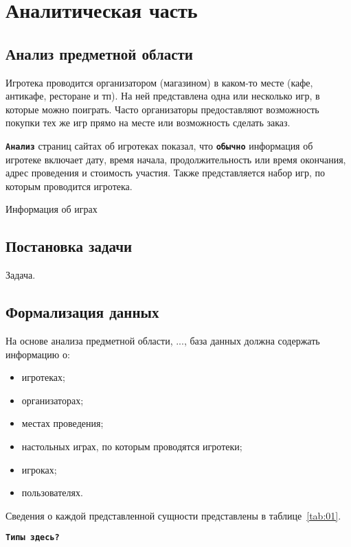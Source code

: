 \chapter{Аналитическая часть}

\section{Анализ предметной области}

Игротека проводится организатором (магазином) в каком-то месте (кафе, антикафе,
ресторане и тп). На ней представлена одна или несколько игр, в которые можно
поиграть. Часто организаторы предоставляют возможность покупки тех же игр прямо
на месте или возможность сделать заказ.

\textbf{\texttt{Анализ}} страниц сайтах об игротеках показал, что
\textbf{\texttt{обычно}} информация об игротеке включает дату, время начала,
продолжительность или время окончания, адрес проведения и стоимость участия.
Также представляется набор игр, по которым проводится игротека.

Информация об играх 

\section{Постановка задачи}

Задача.

\section{Формализация данных}

На основе анализа предметной области, ..., база данных должна содержать
информацию о:

\begin{itemize}
    \item игротеках;
    \item организаторах;
    \item местах проведения;
    \item настольных играх, по которым проводятся игротеки;
    \item игроках;
    \item пользователях.
\end{itemize}

Сведения о каждой представленной сущности представлены в таблице~\ref{tab:01}.

\textbf{\texttt{Типы здесь?}}

